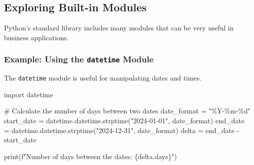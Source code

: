 \documentclass[
  letterpaper,
  DIV=11,
  numbers=noendperiod]{scrreprt}
\newenvironment{Shaded}{\begin{snugshade}}{\end{snugshade}}
\newcommand{\BuiltInTok}[1]{\textcolor[rgb]{0.00,0.23,0.31}{#1}}
\newcommand{\CommentTok}[1]{\textcolor[rgb]{0.37,0.37,0.37}{#1}}
\newcommand{\DecValTok}[1]{\textcolor[rgb]{0.68,0.00,0.00}{#1}}
\newcommand{\ImportTok}[1]{\textcolor[rgb]{0.00,0.46,0.62}{#1}}
\newcommand{\NormalTok}[1]{\textcolor[rgb]{0.00,0.23,0.31}{#1}}
\newcommand{\OperatorTok}[1]{\textcolor[rgb]{0.37,0.37,0.37}{#1}}
\newcommand{\SpecialCharTok}[1]{\textcolor[rgb]{0.37,0.37,0.37}{#1}}
\newcommand{\SpecialStringTok}[1]{\textcolor[rgb]{0.13,0.47,0.30}{#1}}
\newcommand{\StringTok}[1]{\textcolor[rgb]{0.13,0.47,0.30}{#1}}
\begin{document}
\begin{Shaded}
\end{Shaded}

\subsection{Exploring Built-in
Modules}\label{exploring-built-in-modules}

Python's standard library includes many modules that can be very useful
in business applications.

\subsubsection{\texorpdfstring{Example: Using the \texttt{datetime}
Module}{Example: Using the datetime Module}}\label{example-using-the-datetime-module}

The \texttt{datetime} module is useful for manipulating dates and times.

\begin{Shaded}
\begin{Highlighting}[]
\ImportTok{import}\NormalTok{ datetime}

\CommentTok{\# Calculate the number of days between two dates}
\NormalTok{date\_format }\OperatorTok{=} \StringTok{"\%Y{-}\%m{-}}\SpecialCharTok{\%d}\StringTok{"}
\NormalTok{start\_date }\OperatorTok{=}\NormalTok{ datetime.datetime.strptime(}\StringTok{"2024{-}01{-}01"}\NormalTok{, date\_format)}
\NormalTok{end\_date }\OperatorTok{=}\NormalTok{ datetime.datetime.strptime(}\StringTok{"2024{-}12{-}31"}\NormalTok{, date\_format)}
\NormalTok{delta }\OperatorTok{=}\NormalTok{ end\_date }\OperatorTok{{-}}\NormalTok{ start\_date}

\BuiltInTok{print}\NormalTok{(}\SpecialStringTok{f"Number of days between the dates: }\SpecialCharTok{\{}\NormalTok{delta}\SpecialCharTok{.}\NormalTok{days}\SpecialCharTok{\}}\SpecialStringTok{"}\NormalTok{)}
\end{Highlighting}
\end{Shaded}
\end{document}
